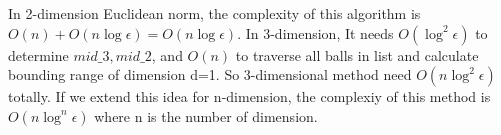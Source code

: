 \documentclass[10pt, conference, compsocconf]{IEEEtran}
\begin{document}

In 2-dimension Euclidean norm, the complexity of this algorithm is $O(n)+O(n\log\epsilon) = O(n\log\epsilon)$. In 3-dimension, It needs $O(\log^2\epsilon)$ to determine $mid\_3, mid\_2$, and $O(n)$ to traverse all balls in list and calculate bounding range of dimension d=1. So 3-dimensional method need $O(n \log^2\epsilon)$ totally. If we extend this idea for n-dimension, the complexiy of this method is $O(n \log^{n}\epsilon)$ where n is the number of dimension.
\end{document}
